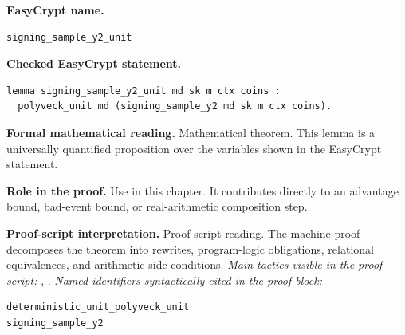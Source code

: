 \begin{formaltheorem}
\noindent\textbf{EasyCrypt name.}
\begin{lstlisting}[language=EasyCrypt,basicstyle=\ttfamily\scriptsize]
signing_sample_y2_unit
\end{lstlisting}
\noindent\textbf{Checked EasyCrypt statement.}
\begin{lstlisting}[language=EasyCrypt,basicstyle=\ttfamily\scriptsize]
lemma signing_sample_y2_unit md sk m ctx coins :
  polyveck_unit md (signing_sample_y2 md sk m ctx coins).
\end{lstlisting}
\noindent\textbf{Formal mathematical reading.}
Mathematical theorem. This lemma is a universally quantified proposition over the variables shown in the EasyCrypt statement.

\noindent\textbf{Role in the proof.}
Use in this chapter. It contributes directly to an advantage bound, bad-event bound, or real-arithmetic composition step.

\noindent\textbf{Proof-script interpretation.}
Proof-script reading. The machine proof decomposes the theorem into rewrites, program-logic obligations, relational equivalences, and arithmetic side conditions.
\emph{Main tactics visible in the proof script:} , .
\emph{Named identifiers syntactically cited in the proof block:}
\begin{lstlisting}[language=EasyCrypt,basicstyle=\ttfamily\scriptsize]
deterministic_unit_polyveck_unit
signing_sample_y2
\end{lstlisting}

\end{formaltheorem}

